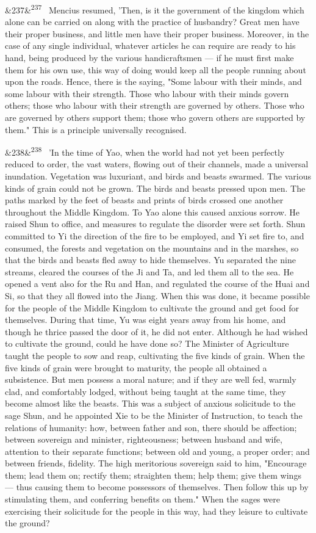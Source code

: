 \documentclass[12pt]{article}
\newcommand{\para}[1][]{\par\noindent\ifx&#1&\else\textsuperscript{\footnotesize #1}~\fi}
\begin{document}
\para[237] Mencius resumed, 'Then, is it the government of the kingdom which alone can be carried on along with the practice of husbandry? Great men have their proper business, and little men have their proper business. Moreover, in the case of any single individual, whatever articles he can require are ready to his hand, being produced by the various handicraftsmen --- if he must first make them for his own use, this way of doing would keep all the people running about upon the roads. Hence, there is the saying, "Some labour with their minds, and some labour with their strength. Those who labour with their minds govern others; those who labour with their strength are governed by others. Those who are governed by others support them; those who govern others are supported by them." This is a principle universally recognised.

\para[238] 'In the time of Yao, when the world had not yet been perfectly reduced to order, the vast waters, flowing out of their channels, made a universal inundation. Vegetation was luxuriant, and birds and beasts swarmed. The various kinds of grain could not be grown. The birds and beasts pressed upon men. The paths marked by the feet of beasts and prints of birds crossed one another throughout the Middle Kingdom. To Yao alone this caused anxious sorrow. He raised Shun to office, and measures to regulate the disorder were set forth. Shun committed to Yi the direction of the fire to be employed, and Yi set fire to, and consumed, the forests and vegetation on the mountains and in the marshes, so that the birds and beasts fled away to hide themselves. Yu separated the nine streams, cleared the courses of the Ji and Ta, and led them all to the sea. He opened a vent also for the Ru and Han, and regulated the course of the Huai and Si, so that they all flowed into the Jiang. When this was done, it became possible for the people of the Middle Kingdom to cultivate the ground and get food for themselves. During that time, Yu was eight years away from his home, and though he thrice passed the door of it, he did not enter. Although he had wished to cultivate the ground, could he have done so? The Minister of Agriculture taught the people to sow and reap, cultivating the five kinds of grain. When the five kinds of grain were brought to maturity, the people all obtained a subsistence. But men possess a moral nature; and if they are well fed, warmly clad, and comfortably lodged, without being taught at the same time, they become almost like the beasts. This was a subject of anxious solicitude to the sage Shun, and he appointed Xie to be the Minister of Instruction, to teach the relations of humanity: how, between father and son, there should be affection; between sovereign and minister, righteousness; between husband and wife, attention to their separate functions; between old and young, a proper order; and between friends, fidelity. The high meritorious sovereign said to him, "Encourage them; lead them on; rectify them; straighten them; help them; give them wings --- thus causing them to become possessors of themselves. Then follow this up by stimulating them, and conferring benefits on them." When the sages were exercising their solicitude for the people in this way, had they leisure to cultivate the ground?
\end{document}
